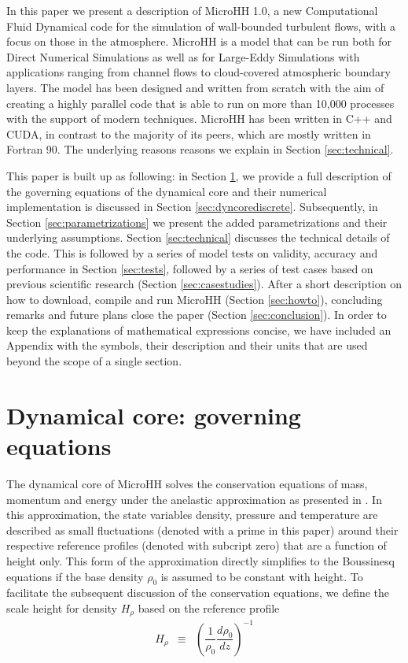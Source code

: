 \documentclass[gmd]{copernicus}
\begin{document}
\introduction  %
In this paper we present a description of MicroHH 1.0, a new Computational Fluid Dynamical code for the simulation of wall-bounded turbulent flows, with a focus on those in the atmosphere. MicroHH is a model that can be run both for Direct Numerical Simulations as well as for Large-Eddy Simulations with applications ranging from channel flows to cloud-covered atmospheric boundary layers. The model has been designed and written from scratch with the aim of creating a highly parallel code that is able to run on more than 10,000 processes with the support of modern techniques. MicroHH has been written in C++ and CUDA, in contrast to the majority of its peers, which are mostly written in Fortran 90. The underlying reasons reasons we explain in Section \ref{sec:technical}.

This paper is built up as following: in Section \ref{sec:dyncore}, we provide a full description of the governing equations of the dynamical core and their numerical implementation is discussed in Section \ref{sec:dyncorediscrete}. Subsequently, in Section \ref{sec:parametrizations} we present the added parametrizations and their underlying assumptions. Section \ref{sec:technical} discusses the technical details of the code. This is followed by a series of model tests on validity, accuracy and performance in Section \ref{sec:tests}, followed by a series of test cases based on previous scientific research (Section \ref{sec:casestudies}). After a short description on how to download, compile and run MicroHH (Section \ref{sec:howto}), concluding remarks and future plans close the paper (Section \ref{sec:conclusion}). In order to keep the explanations of mathematical expressions concise, we have included an Appendix with the symbols, their description and their units that are used beyond the scope of a single section.

\section{Dynamical core: governing equations}\label{sec:dyncore}
The dynamical core of MicroHH solves the conservation equations of mass, momentum and energy under the anelastic approximation as presented in \citet{Bannon1996}. In this approximation, the state variables density, pressure and temperature are described as small fluctuations (denoted with a prime in this paper) around their respective reference profiles (denoted with subcript zero) that are a function of height only. This form of the approximation directly simplifies to the Boussinesq equations if the base density $\rho_0$ is assumed to be constant with height. To facilitate the subsequent discussion of the conservation equations, we define the scale height for density $H_\rho$ based on the reference profile
\begin{eqnarray}
H_{\rho} & \equiv & \left( \dfrac{1}{\rho_0} \dfrac{d \rho_0}{dz} \right)^{-1}
\end{eqnarray}
\end{document}
